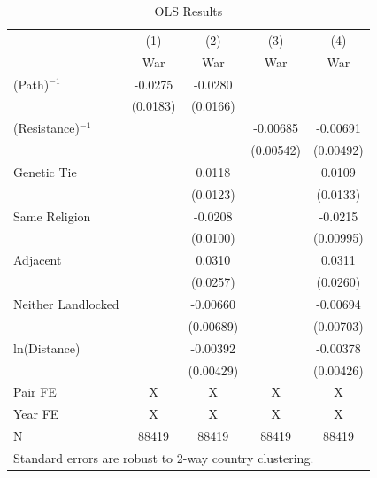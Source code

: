 \documentclass{article}
\begin{document}
\begin{table}[htbp]\centering
\caption{OLS Results \label{tab:OLS}}
\begin{tabular}{l*{4}{c}}
\toprule
                    &\multicolumn{1}{c}{(1)}&\multicolumn{1}{c}{(2)}&\multicolumn{1}{c}{(3)}&\multicolumn{1}{c}{(4)}\\
                    &\multicolumn{1}{c}{War}&\multicolumn{1}{c}{War}&\multicolumn{1}{c}{War}&\multicolumn{1}{c}{War}\\
\midrule
(Path)$^{-1}$       &     -0.0275&     -0.0280&            &            \\
                    &    (0.0183)&    (0.0166)&            &            \\
\addlinespace
(Resistance)$^{-1}$ &            &            &    -0.00685&    -0.00691\\
                    &            &            &   (0.00542)&   (0.00492)\\
\addlinespace
Genetic Tie         &            &      0.0118&            &      0.0109\\
                    &            &    (0.0123)&            &    (0.0133)\\
\addlinespace
Same Religion       &            &     -0.0208&            &     -0.0215\\
                    &            &    (0.0100)&            &   (0.00995)\\
\addlinespace
Adjacent            &            &      0.0310&            &      0.0311\\
                    &            &    (0.0257)&            &    (0.0260)\\
\addlinespace
Neither Landlocked  &            &    -0.00660&            &    -0.00694\\
                    &            &   (0.00689)&            &   (0.00703)\\
\addlinespace
ln(Distance)        &            &    -0.00392&            &    -0.00378\\
                    &            &   (0.00429)&            &   (0.00426)\\
\midrule
Pair FE             &           X&           X&           X&           X\\
Year FE             &           X&           X&           X&           X\\
N                   &       88419&       88419&       88419&       88419\\
\bottomrule
\multicolumn{5}{l}{\footnotesize Standard errors are robust to 2-way country clustering.}\\
\end{tabular}
\end{table}
\end{document}
